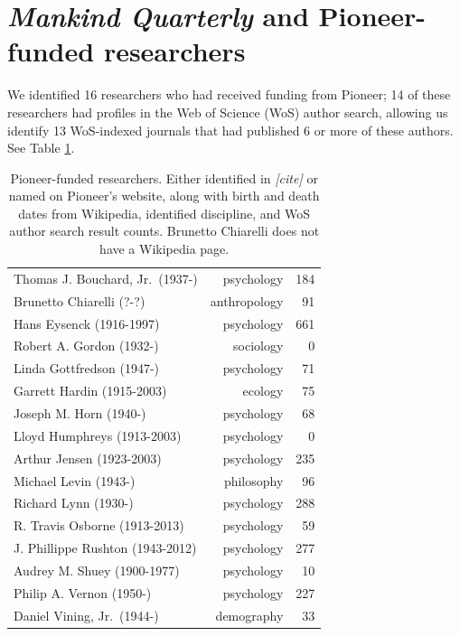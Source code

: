 \documentclass[12pt]{article}
\begin{document}
\hypertarget{mankind-quarterly-and-pioneer-funded-researchers}{%
\section*{\texorpdfstring{\emph{Mankind Quarterly} and Pioneer-funded researchers}{Mankind Quarterly and Pioneer-funded researchers}}\label{mankind-quarterly-and-pioneer-funded-researchers}}

We identified 16 researchers who had received funding from Pioneer; 14 of these researchers had profiles in the Web of Science (WoS) author search, allowing us identify 13 WoS-indexed journals that had published 6 or more of these authors. See Table \ref{tab:researchers}.

\begin{longtable}[]{@{}lrr@{}}
\caption{\label{tab:researchers} Pioneer-funded researchers. Either identified in \emph{{[}cite{]}} or named on Pioneer's website, along with birth and death dates from Wikipedia, identified discipline, and WoS author search result counts. Brunetto Chiarelli does not have a Wikipedia page.}\tabularnewline
\toprule
\endhead
Thomas J. Bouchard, Jr.~(1937-) & psychology & 184 \\
Brunetto Chiarelli (?-?) & anthropology & 91 \\
Hans Eysenck (1916-1997) & psychology & 661 \\
Robert A. Gordon (1932-) & sociology & 0 \\
Linda Gottfredson (1947-) & psychology & 71 \\
Garrett Hardin (1915-2003) & ecology & 75 \\
Joseph M. Horn (1940-) & psychology & 68 \\
Lloyd Humphreys (1913-2003) & psychology & 0 \\
Arthur Jensen (1923-2003) & psychology & 235 \\
Michael Levin (1943-) & philosophy & 96 \\
Richard Lynn (1930-) & psychology & 288 \\
R. Travis Osborne (1913-2013) & psychology & 59 \\
J. Phillippe Rushton (1943-2012) & psychology & 277 \\
Audrey M. Shuey (1900-1977) & psychology & 10 \\
Philip A. Vernon (1950-) & psychology & 227 \\
Daniel Vining, Jr.~(1944-) & demography & 33 \\
\bottomrule
\end{longtable}
\end{document}

